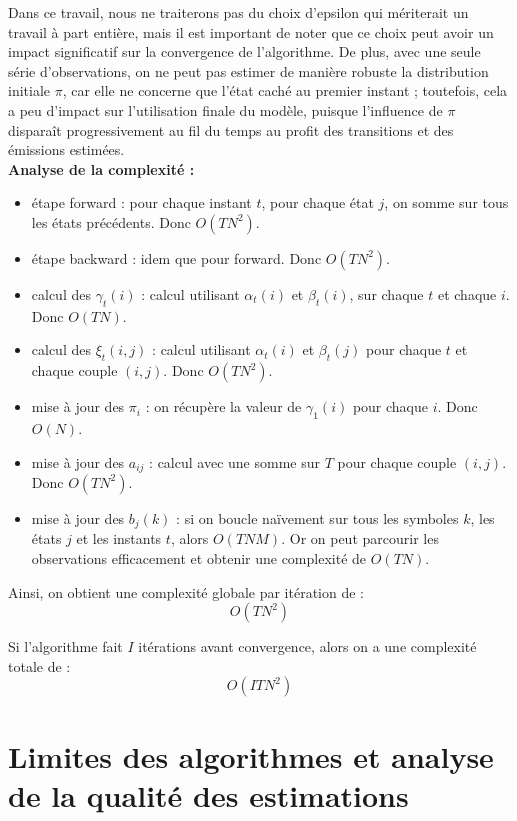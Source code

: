 \documentclass[11pt]{article}
\begin{document}
Dans ce travail, nous ne traiterons pas du choix d'epsilon qui mériterait un travail à part entière, mais il est important de noter que ce choix peut avoir un impact significatif sur la convergence de l'algorithme. De plus, avec une seule série d’observations, on ne peut pas estimer de manière robuste la distribution initiale \(\pi\), car elle ne concerne que l’état caché au premier instant ; toutefois, cela a peu d’impact sur l’utilisation finale du modèle, puisque l’influence de \(\pi\) disparaît progressivement au fil du temps au profit des transitions et des émissions estimées.\\

\textbf{Analyse de la complexité :}
\begin{itemize}
    \item étape forward : pour chaque instant $t$, pour chaque état $j$, on somme sur tous les états précédents. Donc $O(TN^2)$.
    \item étape backward : idem que pour forward. Donc $O(TN^2)$.
    \item calcul des $\gamma_t(i)$ : calcul utilisant $\alpha_t(i)$ et $\beta_t(i)$, sur chaque $t$ et chaque $i$. Donc $O(TN)$.
    \item calcul des $\xi_t(i,j)$ : calcul utilisant $\alpha_t(i)$ et $\beta_t(j)$ pour chaque $t$ et chaque couple $(i,j)$. Donc $O(TN^2)$.
    \item mise à jour des $\pi_i$ : on récupère la valeur de $\gamma_1(i)$ pour chaque $i$. Donc $O(N)$.
    \item mise à jour des $a_{ij}$ : calcul avec une somme sur $T$ pour chaque couple $(i,j)$. Donc $O(TN^2)$.
    \item mise à jour des $b_j(k)$ : si on boucle naïvement sur tous les symboles $k$, les états $j$ et les instants $t$, alors $O(TNM)$. Or on peut parcourir les observations efficacement et obtenir une complexité de $O(TN)$.
\end{itemize}

Ainsi, on obtient une complexité globale par itération de :
\[
O(TN^2)
\]

Si l'algorithme fait $I$ itérations avant convergence, alors on a une complexité totale de :
\[
O(ITN^2)
\]


\newpage
\section{Limites des algorithmes et analyse de la qualité des estimations}
\end{document}
